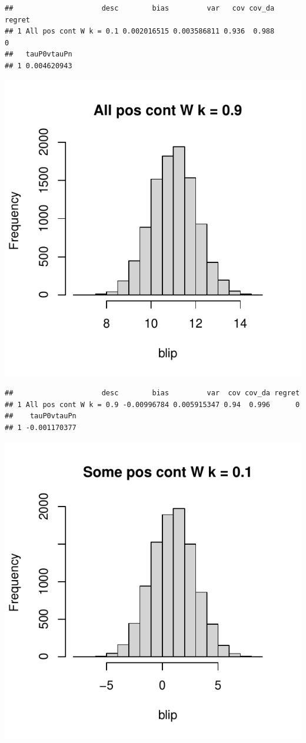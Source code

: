 \documentclass[11pt]{article}\usepackage[]{graphicx}\usepackage[table]{xcolor}
\makeatletter
\def\maxwidth{ %
  \ifdim\Gin@nat@width>\linewidth
    \linewidth
  \else
    \Gin@nat@width
  \fi
}
\newenvironment{kframe}{%
 \def\at@end@of@kframe{}%
 \ifinner\ifhmode%
  \def\at@end@of@kframe{\end{minipage}}%
  \begin{minipage}{\columnwidth}%
 \fi\fi%
 \def\FrameCommand##1{\hskip\@totalleftmargin \hskip-\fboxsep
 \colorbox{shadecolor}{##1}\hskip-\fboxsep
     \hskip-\linewidth \hskip-\@totalleftmargin \hskip\columnwidth}%
 \MakeFramed {\advance\hsize-\width
   \@totalleftmargin\z@ \linewidth\hsize
   \@setminipage}}%
 {\par\unskip\endMakeFramed%
 \at@end@of@kframe}
\newenvironment{knitrout}{}{} %
\makeatother
\begin{document}
\begin{knitrout}
\begin{kframe}\begin{verbatim}
##                     desc        bias         var   cov cov_da regret
## 1 All pos cont W k = 0.1 0.002016515 0.003586811 0.936  0.988      0
##   tauP0vtauPn
## 1 0.004620943
\end{verbatim}
\end{kframe}
\includegraphics[width=\maxwidth]{figure/unnamed-chunk-4-8} 
\begin{kframe}\begin{verbatim}
##                     desc        bias         var  cov cov_da regret
## 1 All pos cont W k = 0.9 -0.00996784 0.005915347 0.94  0.996      0
##    tauP0vtauPn
## 1 -0.001170377
\end{verbatim}
\end{kframe}
\includegraphics[width=\maxwidth]{figure/unnamed-chunk-4-9} 

\end{knitrout}
\end{document}
